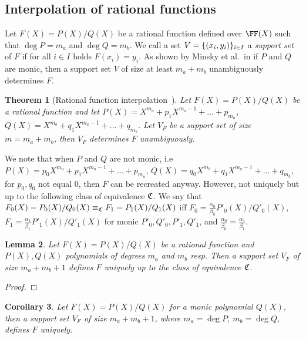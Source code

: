 \documentclass[runningheads]{llncs}
\newtheorem{theorem}{Theorem}%
\newtheorem{lemma}[theorem]{Lemma}
\newtheorem{corollary}[theorem]{Corollary}
\theoremstyle{definition}
\begin{document}
\subsection{Interpolation of rational functions}
Let $F(X) = P(X) / Q(X)$ be a rational function defined over $\FF(X)$ such that $\deg P = m_a$ and $\deg Q = m_b$. We call a set $V = \{(x_i, y_i)\}_{i \in I}$ a \emph{support set} of $F$ if for all $i \in I$ holds $F(x_i) = y_i$. 
As shown by Minsky et al.~in \cite{TIT:MinTraZip03} if $P$ and $Q$ are monic, then a support set $V$ of size at least $m_a + m_b$ unambiguously determines $F$. 

\begin{theorem}[Rational function interpolation~\cite{TIT:MinTraZip03}]
  Let $F(X) = P(X) / Q(X)$ be a rational function and let $P(X) = X^{m_a} + p_1 X^{m_a - 1} + \ldots + p_{m_a}$, $Q(X) = X^{m_b} + q_1 X^{m_a - 1} + \ldots + q_{m_b}$. Let $V_F$ be a support set of size $m = m_a + m_b$, then $V_F$ determines $F$ unambiguously.
\end{theorem}

We note that when $P$ and $Q$ are not monic, i.e~$P(X) = p_0 X^{m_a} + p_1 X^{m_a - 1} + \ldots +  p_{m_a}$, $Q(X) = q_0 X^{m_b} + q_1 X^{m_a - 1} + \ldots + q_{m_b}$, for $p_0, q_0$ not equal $0$,  then $F$ can be recreated anyway. 
However, not uniquely but up to the following class of equivalence $\mathfrak{C}$. 
We say that $F_0(X) = P_0(X) / Q_0(X)  \equiv_{\mathfrak{C}} F_1 = P_1(X) / Q_1(X)$ iff $F_0 = \frac{\alpha_0}{\beta_0} P'_0 (X) / Q'_0(X)$, $F_1 = \frac{\alpha_1}{\beta_1} P'_1 (X) / Q'_1(X)$ for monic $P'_0, Q'_0, P'_1, Q'_1$, and $\frac{\alpha_0}{\beta_0} = \frac{\alpha_1}{\beta_1}$.
\begin{lemma}
  Let $F (X) = P(X) / Q(X)$ be a rational function and $P(X), Q(X)$ polynomials of degrees $m_a$ and $m_b$ resp. Then a support set $V_F$ of size $m_a + m_b + 1$ defines $F$ uniquely up to the class of equivalence $\mathfrak{C}$. 
\end{lemma}
\begin{proof}
\end{proof}
\begin{corollary}
  Let $F(X) = P(X) / Q(X)$ for a monic polynomial $Q(X)$, then a support set $V_F$ of size $m_a + m_b + 1$, where $m_a = \deg P$, $m_b = \deg Q$, defines $F$ uniquely.
\end{corollary}
\end{document}
